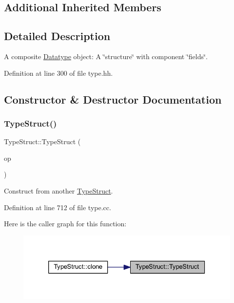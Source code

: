 \subsection*{Additional Inherited Members}


\subsection{Detailed Description}
A composite \mbox{\hyperlink{class_datatype}{Datatype}} object\+: A \char`\"{}structure\char`\"{} with component \char`\"{}fields\char`\"{}. 

Definition at line 300 of file type.\+hh.



\subsection{Constructor \& Destructor Documentation}
\mbox{\label{class_type_struct_a59569e7e7c6d5fc43ec7617199cd8a19}} 
\subsubsection{\texorpdfstring{TypeStruct()}{TypeStruct()}\hspace{0.1cm}{\footnotesize\ttfamily [1/2]}}
{\footnotesize\ttfamily Type\+Struct\+::\+Type\+Struct (\begin{DoxyParamCaption}\item[{const \mbox{\hyperlink{class_type_struct}{Type\+Struct}} \&}]{op }\end{DoxyParamCaption})}



Construct from another \mbox{\hyperlink{class_type_struct}{Type\+Struct}}. 



Definition at line 712 of file type.\+cc.

Here is the caller graph for this function\+:
\nopagebreak
\begin{figure}[H]
\begin{center}
\leavevmode
\includegraphics[width=326pt]{class_type_struct_a59569e7e7c6d5fc43ec7617199cd8a19_icgraph}
\end{center}
\end{figure}
\mbox{\label{class_type_struct_a52aa6654acd207898ce84dcf774162ad}} 
